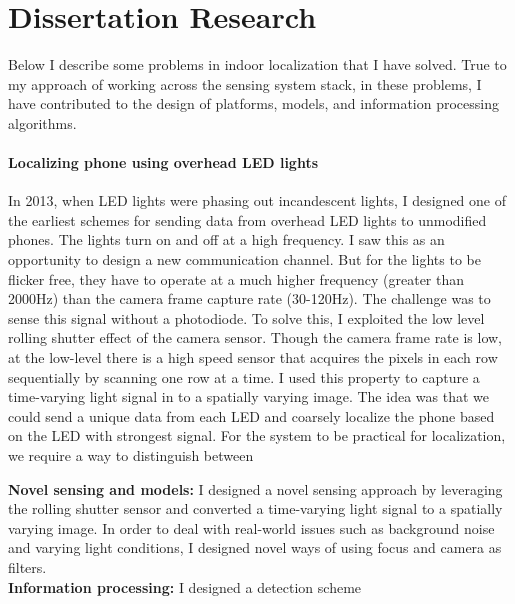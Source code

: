 \documentclass[10pt]{article}
\begin{document}

\section{Dissertation Research}
Below I describe some problems in indoor localization that I have solved. True to my approach of working across the sensing system stack, in these problems, I have contributed to the design of platforms, models, and information processing algorithms.\\

\paragraph{Localizing phone using overhead LED lights}
In 2013, when LED lights were phasing out incandescent lights, I designed one of the earliest schemes for sending data from overhead LED lights to unmodified phones. The lights turn on and off at a high frequency. I saw this as an opportunity to design a new communication channel. But for the lights to be flicker free, they have to operate at a much higher frequency (greater than 2000Hz) than the camera frame capture rate (30-120Hz). The challenge was to sense this signal without a photodiode. To solve this, I exploited the low level rolling shutter effect of the camera sensor. Though the camera frame rate is low, at the low-level there is a high speed sensor that acquires the pixels in each row sequentially by scanning one row at a time. I used this property to capture a time-varying light signal in to a spatially varying image. 
The idea was that we could send a unique data from each LED and coarsely localize the phone based on the LED with strongest signal. For the system to be practical for localization, we require a way to distinguish between 

\textbf{Novel sensing and models: }
 I designed a novel sensing approach by leveraging the rolling shutter sensor and converted a time-varying light signal to a spatially varying image. In order to deal with real-world issues such as background noise and varying light conditions, I designed novel ways of using focus and camera as filters.\\
 \textbf{Information processing: } I designed a detection scheme 
\end{document}
